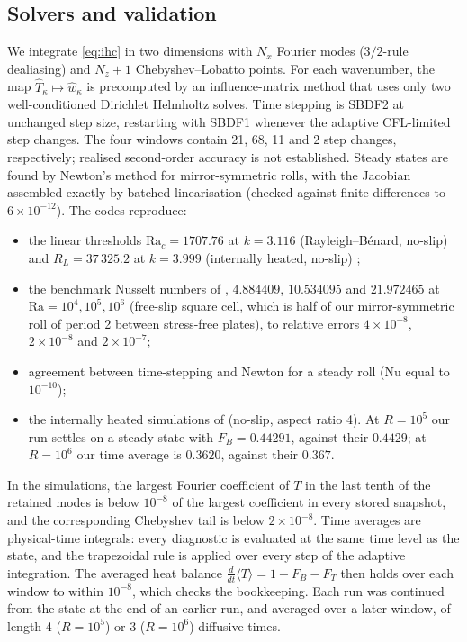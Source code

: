 \subsection{Solvers and validation}
We integrate \eqref{eq:ihc} in two dimensions with $N_x$ Fourier modes ($3/2$-rule dealiasing) and $N_z+1$
Chebyshev--Lobatto points. For each wavenumber, the map $\hat T_\kappa\mapsto\hat w_\kappa$ is precomputed by an
influence-matrix method that uses only two well-conditioned Dirichlet Helmholtz solves. Time stepping is
SBDF2 at unchanged step size, restarting with SBDF1 whenever the adaptive CFL-limited step changes.
The four windows contain 21, 68, 11 and 2 step changes, respectively; realised second-order accuracy is not established. Steady states are found by Newton's method
for mirror-symmetric rolls, with the Jacobian assembled exactly by batched linearisation (checked against
finite differences to $6\times10^{-12}$). The codes reproduce:
\begin{itemize}
\item the linear thresholds $\mathrm{Ra}_c=1707.76$ at $k=3.116$ (Rayleigh--B\'enard, no-slip) and
$R_L=37\,325.2$ at $k=3.999$ (internally heated, no-slip) \citep{Goluskin2016};
\item the benchmark Nusselt numbers of \citet{Blankenbach1989}, $4.884409$, $10.534095$ and $21.972465$ at
$\mathrm{Ra}=10^4,10^5,10^6$ (free-slip square cell, which is half of our mirror-symmetric roll of period 2 between
stress-free plates), to relative errors $4\times10^{-8}$, $2\times10^{-8}$ and $2\times10^{-7}$;
\item agreement between time-stepping and Newton for a steady roll (Nu equal to $10^{-10}$);
\item the internally heated simulations of \citet{ArslanRojas2025} (no-slip, aspect ratio 4). At $R=10^5$ our
run settles on a steady state with $F_B=0.44291$, against their $0.4429$; at $R=10^6$ our time average is
$0.3620$, against their $0.367$.
\end{itemize}
In the simulations, the largest Fourier coefficient of $T$ in the last tenth of the retained modes is below
$10^{-8}$ of the largest coefficient in every stored snapshot, and the corresponding Chebyshev tail is below
$2\times10^{-8}$. Time averages are physical-time integrals: every diagnostic is evaluated at the same time level
as the state, and the trapezoidal rule is applied over every step of the adaptive integration. The averaged heat
balance $\frac d{dt}\langle T\rangle=1-F_B-F_T$ then holds over each window to within $10^{-8}$, which checks the
bookkeeping. Each run was continued from the state at the end of an earlier run, and averaged over a later
window, of length 4 ($R=10^5$) or 3 ($R=10^6$) diffusive times.


